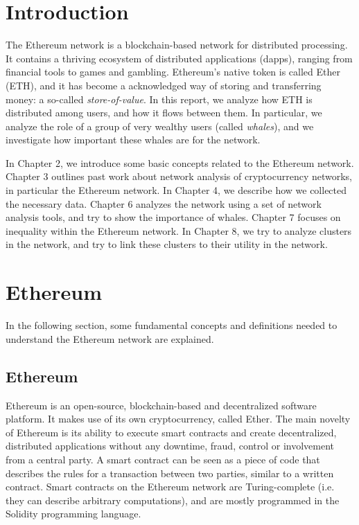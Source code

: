 \documentclass[10pt,a4paper]{article}
\begin{document}
\begin{multicols}{2}

\section{Introduction}
The Ethereum network is a blockchain-based network for distributed processing. It contains a thriving ecosystem of distributed applications (dapps), ranging from financial tools to games and gambling. Ethereum's native token is called Ether (ETH), and it has become a acknowledged way of storing and transferring money: a so-called \textit{store-of-value}. In this report, we analyze how ETH is distributed among users, and how it flows between them. In particular, we analyze the role of a group of very wealthy users (called \textit{whales}), and we investigate how important these whales are for the network.

In Chapter 2, we introduce some basic concepts related to the Ethereum network. Chapter 3 outlines past work about network analysis of cryptocurrency networks, in particular the Ethereum network. In Chapter 4, we describe how we collected the necessary data. Chapter 6 analyzes the network using a set of network analysis tools, and try to show the importance of whales. Chapter 7 focuses on inequality within the Ethereum network. In Chapter 8, we try to analyze clusters in the network, and try to link these clusters to their utility in the network. 

\section{Ethereum}

In the following section, some fundamental concepts and definitions needed to understand the Ethereum network are explained.  

\subsection{Ethereum}
Ethereum is an open-source, blockchain-based and decentralized software platform. It makes use of its own cryptocurrency, called Ether. The main novelty of Ethereum is its ability to execute smart contracts and create decentralized, distributed applications without any downtime, fraud, control or involvement from a central party. A smart contract can be seen as a piece of code that describes the rules for a transaction between two parties, similar to a written contract. Smart contracts on the Ethereum network are Turing-complete (i.e. they can describe arbitrary computations), and are mostly programmed in the Solidity programming language. 

\end{multicols}
\end{document}
